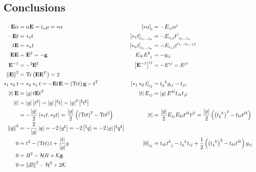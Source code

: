 \documentclass[a4paper,7pt]{scrartcl}
\newcommand{\gauss}{\mathcal{K}}
\newcommand{\mean}{\mathcal{H}}
\newcommand{\iup}{\mathrm{i}}
\newcommand{\Tr}{\mathrm{Tr}}
\newcommand{\gb}{\mathbf{g}}
\newcommand{\Eb}{\mathbf{E}}
\begin{document}
\subsection{Conclusions}
  \begin{align*}
    -\Eb\alpha &= \alpha\Eb = \iup_{\alpha}\mu = *\alpha
            &\left[ *\alpha \right]_{i} &= -E_{ij}\alpha^{j}\\
     -\Eb t &= *_{1}t 
            &\left[ *_{1}t \right]_{i_{1}\ldots i_{n}} &= -E_{i_{1}j}\tensor{t}{^{j}_{i_{2}\ldots i_{n}}} \\
      t\Eb &= *_{n}t
            &\left[ *_{n}t \right]_{i_{1}\ldots i_{n}} &= -E_{i_{n}j}\tensor{t}{^{i_{1}\ldots i_{n-1}}^{j}} \\
      \Eb\Eb &= \Eb^{2} = -\gb
            &E_{ik}\tensor{E}{^{k}_{j}} &= -g_{ij} \\
      \Eb^{-1} &= -\tensor[^{\sharp}]{\Eb}{^{\sharp}}
            &\left[ \Eb^{-1} \right]^{ij} &= -E^{ij} = E^{ji}\\
      \left\| \Eb \right\|^{2} &= \Tr\left( \Eb\Eb^{T} \right) = 2 \\
      *_{1}*_{2}t &= *_{2}*_{1}t = -\Eb t \Eb = \left( \Tr t \right)\gb - t^{T}
                &\left[ *_{1}*_{2}t \right]_{ij} &= \tensor{t}{_{k}^{k}}g_{ij} - t_{ji} \\
      \left| t \right|\Eb &= \left| g \right|t\Eb t^{T}
                &\left| t \right|E_{ij} &= \left| g \right|E^{kl}t_{ik}t_{jl} \\
      \left| t \right| &=\left| g \right|\left| t^{\sharp} \right| = \left| g \right|\left| ^{\sharp}t \right| = \left| g \right|^{2}\left| ^{\sharp}t^{\sharp} \right|\\
        &= -\frac{\left| g \right|}{2}\left\langle *_{1}t , *_{2}t \right\rangle = \frac{\left| g \right|}{2}\left( \left( \Tr t \right)^{2} - \Tr t^{2} \right)
                &\left| t \right| &= \frac{\left| g \right|}{2} E_{ij}E_{kl}t^{ik}t^{jl} = \frac{\left| g \right|}{2}\left( \left( \tensor{t}{_{k}^{k}} \right)^{2} - t_{kl}t^{lk} \right)\\
      \left\| q \right\|^{2} &= -\frac{2}{\left| g \right|}\left| q \right|
                              = -2\left| q^{\sharp} \right|
                              = -2\left| {}^{\sharp}q \right|
                              = -2\left| g \right|\left| {}^{\sharp}q^{\sharp} \right|\\
      0 &= t^{2} - \left( \Tr t \right) t + \frac{\left| t \right|}{\left| g \right|} g
            &\left[ 0 \right]_{ij} &= t_{ik}\tensor{t}{^{k}_{j}} -  \tensor{t}{_{k}^{k}}t_{ij} + \frac{1}{2}\left( \left( \tensor{t}{_{k}^{k}} \right)^{2} - t_{kl}t^{lk} \right)g_{ij}\\
      0 &= B^{2} -\mean B + \gauss \gb\\
      0 &= \left\| B \right\|^{2} - \mean^{2} + 2\gauss 
  \end{align*}
\end{document}
